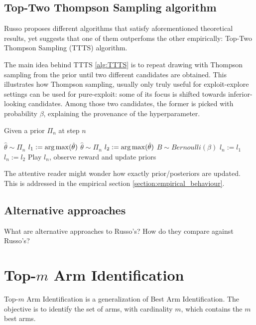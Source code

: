 \subsection{Top-Two Thompson Sampling algorithm}

Russo proposes different algorithms that satisfy aforementioned theoretical results, yet suggests that one of them outperfoms the other empirically: Top-Two Thompson Sampling (TTTS) algorithm.

The main idea behind TTTS \ref{alg:TTTS} is to repeat drawing with Thompson sampling from the prior until two different candidates are obtained. This illustrates how Thompson sampling, usually only truly useful for exploit-explore settings can be used for pure-exploit: some of its focus is shifted towards inferior-looking candidates. Among those two candidates, the former is picked with probability $\beta$, explaining the provenance of the hyperparameter.

\begin{algorithm}[H]
    \caption{Given a prior $\Pi_n$ at step $n$}
    \label{alg:TTTS}
  \begin{algorithmic}
    \State $\hat{\theta} \sim \Pi_n$
    \State $l_1 := \operatorname*{arg\,max}(\hat{\theta})$
    \Repeat
      \State $\hat{\theta} \sim \Pi_n$
      \State $l_2 := \operatorname*{arg\,max}(\hat{\theta})$
    \State $B \sim Bernoulli(\beta)$
      \State $l_n := l_1$
    \Else
      \State $l_n := l_2$
    \EndIf
    \State Play $l_n$, observe reward and update priors
  \end{algorithmic}
\end{algorithm}

The attentive reader might wonder how exactly prior/posteriors are updated. This is addressed in the empirical section \ref{section:empirical_behaviour}.

\subsection{Alternative approaches}
What are alternative approaches to Russo's?
How do they compare against Russo's?

\section{Top-$m$ Arm Identification}

Top-$m$ Arm Identification is a generalization of Best Arm Identification. The objective is to identify the set of arms, with cardinality $m$, which contains the $m$ best arms.


